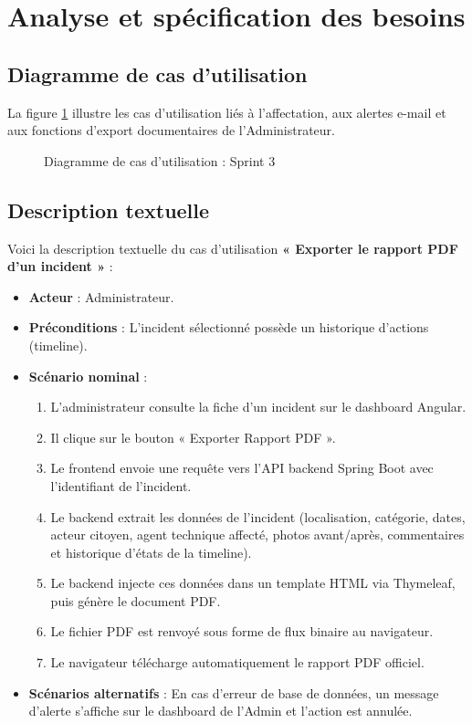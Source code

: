 \section{Analyse et spécification des besoins}

\subsection{Diagramme de cas d'utilisation}
La figure \ref{fig:uc_sprint3} illustre les cas d'utilisation liés à l'affectation, aux alertes e-mail et aux fonctions d'export documentaires de l'Administrateur.

\begin{figure}[H]
    \centering
    \caption{Diagramme de cas d'utilisation : Sprint 3}
    \label{fig:uc_sprint3}
\end{figure}

\subsection{Description textuelle}
Voici la description textuelle du cas d'utilisation \textbf{« Exporter le rapport PDF d'un incident »} :
\begin{itemize}
    \item \textbf{Acteur} : Administrateur.
    \item \textbf{Préconditions} : L'incident sélectionné possède un historique d'actions (timeline).
    \item \textbf{Scénario nominal} :
    \begin{enumerate}
        \item L'administrateur consulte la fiche d'un incident sur le dashboard Angular.
        \item Il clique sur le bouton « Exporter Rapport PDF ».
        \item Le frontend envoie une requête vers l'API backend Spring Boot avec l'identifiant de l'incident.
        \item Le backend extrait les données de l'incident (localisation, catégorie, dates, acteur citoyen, agent technique affecté, photos avant/après, commentaires et historique d'états de la timeline).
        \item Le backend injecte ces données dans un template HTML via Thymeleaf, puis génère le document PDF.
        \item Le fichier PDF est renvoyé sous forme de flux binaire au navigateur.
        \item Le navigateur télécharge automatiquement le rapport PDF officiel.
    \end{enumerate}
    \item \textbf{Scénarios alternatifs} : En cas d'erreur de base de données, un message d'alerte s'affiche sur le dashboard de l'Admin et l'action est annulée.
\end{itemize}

